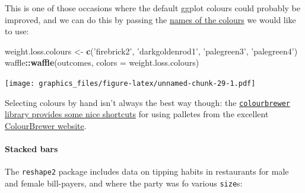 \documentclass[]{article}
\newenvironment{Shaded}{\begin{snugshade}}{\end{snugshade}}
\newcommand{\DataTypeTok}[1]{\textcolor[rgb]{0.13,0.29,0.53}{#1}}
\newcommand{\KeywordTok}[1]{\textcolor[rgb]{0.13,0.29,0.53}{\textbf{#1}}}
\newcommand{\NormalTok}[1]{#1}
\newcommand{\OperatorTok}[1]{\textcolor[rgb]{0.81,0.36,0.00}{\textbf{#1}}}
\newcommand{\StringTok}[1]{\textcolor[rgb]{0.31,0.60,0.02}{#1}}
\let\oldparagraph\paragraph
\renewcommand{\paragraph}[1]{\oldparagraph{#1}\mbox{}}
\begin{document}
This is one of those occasions where the default ggplot colours could probably
be improved, and we can do this by passing the
\protect\hyperlink{named-colours}{names of the colours} we would like to use:

\begin{Shaded}
\begin{Highlighting}[]
\NormalTok{weight.loss.colours <-}\StringTok{ }\KeywordTok{c}\NormalTok{(}\StringTok{'firebrick2'}\NormalTok{, }\StringTok{'darkgoldenrod1'}\NormalTok{, }\StringTok{'palegreen3'}\NormalTok{, }\StringTok{'palegreen4'}\NormalTok{)}
\NormalTok{waffle}\OperatorTok{::}\KeywordTok{waffle}\NormalTok{(outcomes, }\DataTypeTok{colors =}\NormalTok{ weight.loss.colours)}
\end{Highlighting}
\end{Shaded}

\texttt{[image: graphics\_files/figure-latex/unnamed-chunk-29-1.pdf]}

Selecting colours by hand isn't always the best way though: the
\protect\hyperlink{color-brewer}{\texttt{colourbrewer} library provides some nice shortcuts} for using
palletes from the excellent \href{http://colorbrewer2.org}{ColourBrewer website}.

\hypertarget{stacked-bars}{%
\paragraph{Stacked bars}\label{stacked-bars}}

The \texttt{reshape2} package includes data on tipping habits in restaurants for male
and female bill-payers, and where the party was fo various \texttt{size}s:

\begin{Shaded}
\end{Shaded}
\end{document}
